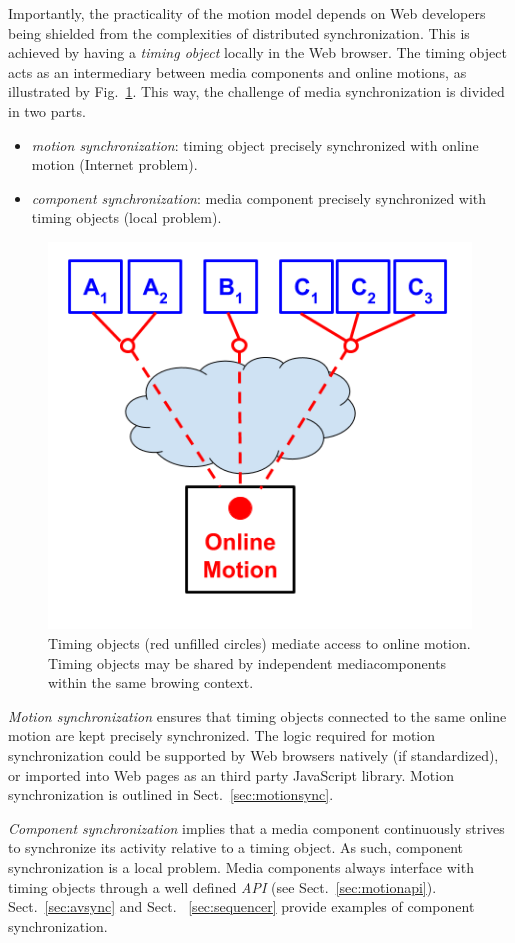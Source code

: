 Importantly, the practicality of the motion model depends on Web developers
being shielded from the complexities of distributed synchronization. This is
achieved by having a \emph{timing object} locally in the Web browser. The
timing object acts as an intermediary between media components and online
motions, as illustrated by Fig.~\ref{fig:model-2}. This way, the challenge of
media synchronization is divided in two parts.

\begin{itemize}
\item{\emph{motion synchronization}: timing object precisely synchronized with online motion (Internet problem).}
\item{\emph{component synchronization}: media component precisely synchronized with timing objects (local problem).} 
\end{itemize}


\begin{figure}[h]
\centering
\includegraphics[scale=.4]{fig/motion-model-2.png}
\caption{Timing objects (red unfilled circles) mediate access to online motion. Timing objects may be shared by independent mediacomponents within the same browing context.}
\label{fig:model-2}
\end{figure}

\emph{Motion synchronization} ensures that timing objects connected to the
same online motion are kept precisely synchronized. The logic required for
motion synchronization could be supported by Web browsers natively (if
standardized), or imported into Web pages as an third party JavaScript
library. Motion synchronization is outlined in Sect.~\ref{sec:motionsync}.

\emph{Component synchronization} implies that a media component continuously
strives to synchronize its activity relative to a timing object. As such,
component synchronization is a local problem. Media components always
interface with timing objects through a well defined \emph{API} (see
Sect.~\ref{sec:motionapi}). Sect.~\ref{sec:avsync} and Sect.
~\ref{sec:sequencer} provide examples of component synchronization.

